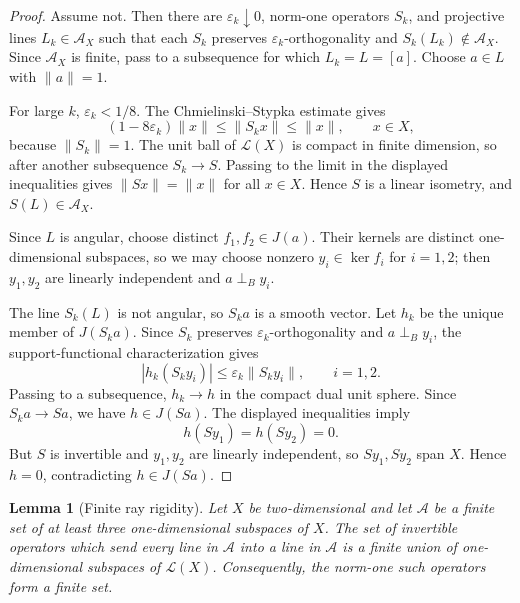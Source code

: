 \documentclass[11pt]{article}
\newtheorem{lemma}{Lemma}
\newcommand{\eps}{\varepsilon}
\newcommand{\cA}{\mathcal A}
\newcommand{\cL}{\mathcal L}
\newcommand{\perpB}{\perp_B}
\begin{document}
\begin{proof}
Assume not.  Then there are \(\eps_k\downarrow0\), norm-one operators
\(S_k\), and projective lines \(L_k\in\cA_X\) such that each \(S_k\) preserves
\(\eps_k\)-orthogonality and \(S_k(L_k)\notin\cA_X\).  Since \(\cA_X\) is
finite, pass to a subsequence for which \(L_k=L=[a]\).  Choose \(a\in L\) with
\(\|a\|=1\).

For large \(k\), \(\eps_k<1/8\).  The Chmielinski--Stypka estimate gives
\[
  (1-8\eps_k)\|x\|\leq \|S_kx\|\leq \|x\|,\qquad x\in X,
\]
because \(\|S_k\|=1\).  The unit ball of \(\cL(X)\) is compact in finite
dimension, so after another subsequence \(S_k\to S\).  Passing to the limit in
the displayed inequalities gives \(\|Sx\|=\|x\|\) for all \(x\in X\).  Hence
\(S\) is a linear isometry, and \(S(L)\in\cA_X\).

Since \(L\) is angular, choose distinct \(f_1,f_2\in J(a)\).  Their kernels are
distinct one-dimensional subspaces, so we may choose nonzero
\(y_i\in\ker f_i\) for \(i=1,2\); then \(y_1,y_2\) are linearly independent and
\(a\perpB y_i\).

The line \(S_k(L)\) is not angular, so \(S_ka\) is a smooth vector.  Let
\(h_k\) be the unique member of \(J(S_ka)\).  Since \(S_k\) preserves
\(\eps_k\)-orthogonality and \(a\perpB y_i\), the support-functional
characterization gives
\[
  |h_k(S_ky_i)|\leq \eps_k\|S_ky_i\|,\qquad i=1,2.
\]
Passing to a subsequence, \(h_k\to h\) in the compact dual unit sphere.  Since
\(S_k a\to Sa\), we have \(h\in J(Sa)\).  The displayed inequalities imply
\[
  h(Sy_1)=h(Sy_2)=0.
\]
But \(S\) is invertible and \(y_1,y_2\) are linearly independent, so
\(Sy_1,Sy_2\) span \(X\).  Hence \(h=0\), contradicting \(h\in J(Sa)\).
\end{proof}

\begin{lemma}[Finite ray rigidity]
\label{lem:ray-rigidity}
Let \(X\) be two-dimensional and let \(\cA\) be a finite set of at least three
one-dimensional subspaces of \(X\).  The set of invertible operators which send
every line in \(\cA\) into a line in \(\cA\) is a finite union of
one-dimensional subspaces of \(\cL(X)\).  Consequently, the norm-one such
operators form a finite set.
\end{lemma}
\end{document}
